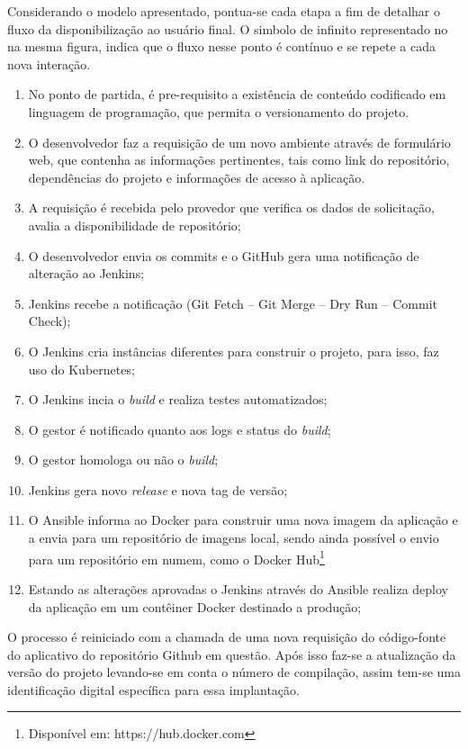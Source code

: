 Considerando o modelo apresentado, pontua-se cada etapa a fim de detalhar o fluxo da disponibilização ao usuário final. O simbolo de infinito representado no na mesma figura, indica que o fluxo nesse ponto é contínuo e se repete a cada nova interação.

\begin{enumerate}
	\item No ponto de partida, é pre-requisito a existência de conteúdo codificado em linguagem de programação, que permita o versionamento do projeto.
	\item O desenvolvedor faz a requisição de um novo ambiente através de formulário web, que contenha as informações pertinentes, tais como link do repositório, dependências do projeto e informações de acesso à aplicação.
	\item A requisição é recebida pelo provedor que verifica os dados de solicitação, avalia a disponibilidade de repositório;
	\item O desenvolvedor envia os commits e o GitHub gera uma notificação de alteração ao Jenkins;
	\item Jenkins recebe a notificação (Git Fetch – Git Merge – Dry Run – Commit Check);
	\item O Jenkins cria instâncias diferentes para construir o projeto, para isso, faz uso do Kubernetes;
	\item O Jenkins incia o \textit{build} e realiza testes automatizados;
	\item O gestor é notificado quanto aos logs e status do \textit{build};
	\item O gestor homologa ou não o \textit{build};
	\item Jenkins gera novo \textit{release} e nova tag de versão;
\item O Ansible informa ao Docker para construir uma nova imagem da aplicação e a envia para um repositório de imagens local, sendo ainda possível o envio para um repositório em numem, como o Docker Hub\footnote{Disponível em: https://hub.docker.com}
	\item Estando as alterações aprovadas o Jenkins através do Ansible realiza deploy da aplicação em um contêiner Docker destinado a produção;
\end{enumerate}

O processo é reiniciado com a chamada de uma nova requisição do código-fonte do aplicativo do repositório Github em questão. Após isso faz-se a atualização da versão do projeto levando-se em conta o número de compilação, assim tem-se uma identificação digital específica para essa implantação.
    \vspace*{0.5cm}

